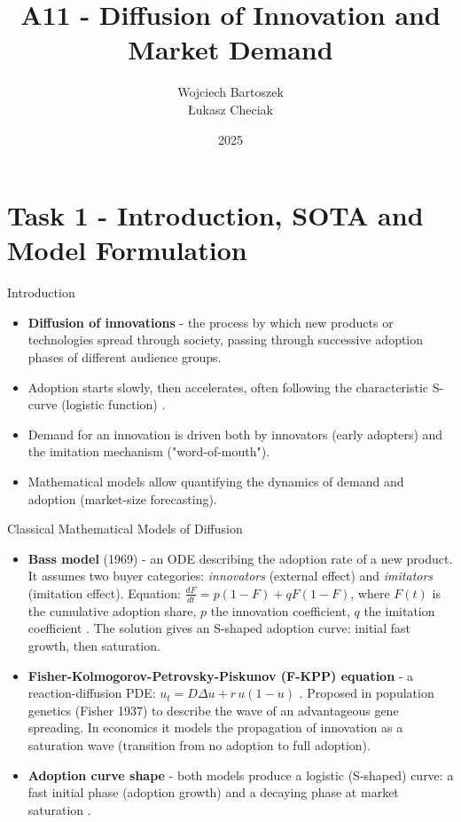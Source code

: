 \documentclass[9pt]{beamer}
\title{A11 - Diffusion of Innovation and Market Demand}
\author{Wojciech Bartoszek \\ Łukasz Checiak}
\date{2025}
\begin{document}
\begin{frame}
  \titlepage
\end{frame}

\section*{Task 1 - Introduction, SOTA and Model Formulation}

\begin{frame}{Introduction}
\begin{itemize}
  \item \textbf{Diffusion of innovations} - the process by which new products or technologies spread through society, passing through successive adoption phases of different audience groups.
  \item Adoption starts slowly, then accelerates, often following the characteristic S-curve (logistic function) \cite{bass:1969}.
  \item Demand for an innovation is driven both by innovators (early adopters) and the imitation mechanism ("word-of-mouth").
  \item Mathematical models allow quantifying the dynamics of demand and adoption (market-size forecasting).
\end{itemize}
\end{frame}

\begin{frame}{Classical Mathematical Models of Diffusion}
\begin{itemize}
  \item \textbf{Bass model} (1969) - an ODE describing the adoption rate of a new product. It assumes two buyer categories: \emph{innovators} (external effect) and \emph{imitators} (imitation effect). Equation: $\frac{dF}{dt}=p(1-F)+qF(1-F)$, where $F(t)$ is the cumulative adoption share, $p$ the innovation coefficient, $q$ the imitation coefficient \cite{bass:1969}. The solution gives an S-shaped adoption curve: initial fast growth, then saturation.
  \item \textbf{Fisher-Kolmogorov-Petrovsky-Piskunov (F-KPP) equation} - a reaction-diffusion PDE: $u_t = D \Delta u + r\,u(1-u)$ \cite{fisher1937}. Proposed in population genetics (Fisher 1937) to describe the wave of an advantageous gene spreading. In economics it models the propagation of innovation as a saturation wave (transition from no adoption to full adoption).
  \item \textbf{Adoption curve shape} - both models produce a logistic (S-shaped) curve: a fast initial phase (adoption growth) and a decaying phase at market saturation \cite{bass:1969,fisher1937}.
\end{itemize}
\end{frame}
\end{document}
